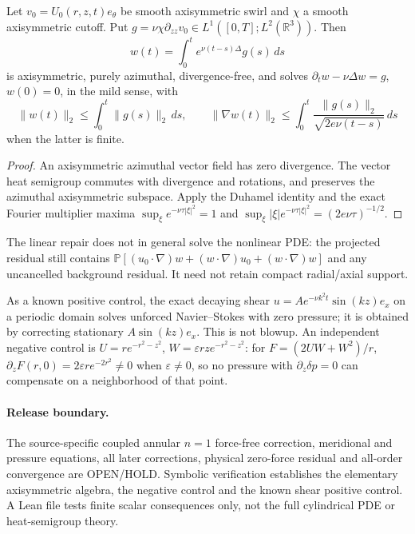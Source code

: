 \begin{proposition}
Let $v_0=U_0(r,z,t)e_\theta$ be smooth axisymmetric swirl and
$\chi$ a smooth axisymmetric cutoff. Put
$g=\nu\chi\partial_{zz}v_0\in L^1([0,T];L^2(\mathbb R^3))$.
Then
\[
w(t)=\int_0^t e^{\nu(t-s)\Delta}g(s)\,ds
\]
is axisymmetric, purely azimuthal, divergence-free, and solves
$\partial_tw-\nu\Delta w=g$, $w(0)=0$, in the mild sense,
with
\[
\|w(t)\|_2\le\int_0^t\|g(s)\|_2\,ds,\qquad
\|\nabla w(t)\|_2\le
\int_0^t\frac{\|g(s)\|_2}{\sqrt{2e\nu(t-s)}}\,ds
\]
when the latter is finite.
\end{proposition}
\begin{proof}
An axisymmetric azimuthal vector field has zero divergence.
The vector heat semigroup commutes with divergence and rotations,
and preserves the azimuthal axisymmetric subspace. Apply the
Duhamel identity and the exact Fourier multiplier maxima
$\sup_{\xi}e^{-\nu\tau|\xi|^2}=1$ and
$\sup_\xi|\xi|e^{-\nu\tau|\xi|^2}=(2e\nu\tau)^{-1/2}$.
\end{proof}
The linear repair does not in general solve the nonlinear PDE:
the projected residual still contains
$\mathbb P[(u_0\cdot\nabla)w+(w\cdot\nabla)u_0+(w\cdot\nabla)w]$
and any uncancelled background residual. It need not retain
compact radial/axial support.

As a known positive control, the exact decaying shear
$u=Ae^{-\nu k^2t}\sin(kz)e_x$ on a periodic domain solves
unforced Navier--Stokes with zero pressure; it is obtained
by correcting stationary $A\sin(kz)e_x$. This is not blowup.
An independent negative control is
$U=re^{-r^2-z^2}$, $W=\varepsilon rz e^{-r^2-z^2}$:
for $F=(2UW+W^2)/r$,
$\partial_z F(r,0)=2\varepsilon r e^{-2r^2}\ne0$ when
$\varepsilon\ne0$, so no pressure with $\partial_z\delta p=0$
can compensate on a neighborhood of that point.

\paragraph{Release boundary.}
The source-specific coupled annular $n=1$ force-free correction,
meridional and pressure equations, all later corrections,
physical zero-force residual and all-order convergence are
OPEN/HOLD. Symbolic verification establishes the elementary
axisymmetric algebra, the negative control and the known shear
positive control. A Lean file tests finite scalar consequences
only, not the full cylindrical PDE or heat-semigroup theory.